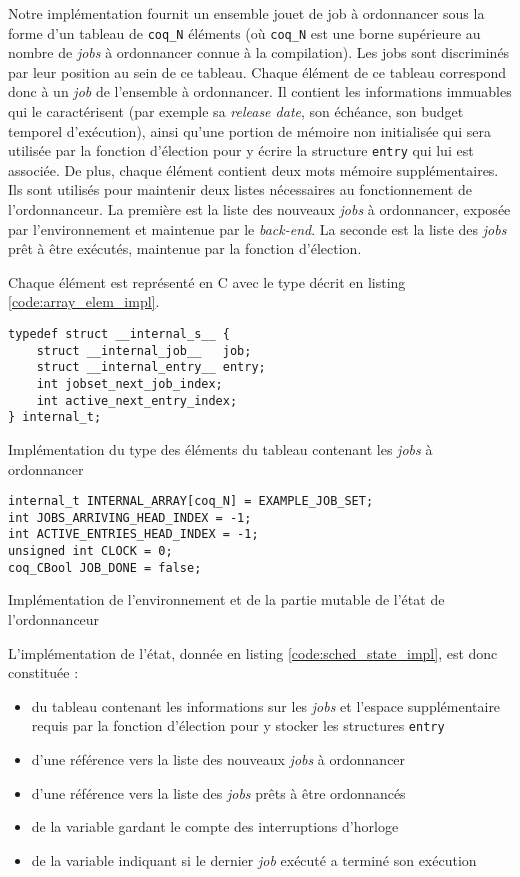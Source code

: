 	Notre implémentation fournit un ensemble jouet de job à ordonnancer sous la forme d'un tableau de \texttt{coq\_N} éléments (où \texttt{coq\_N} est une borne supérieure au nombre de \emph{jobs} à ordonnancer connue à la compilation). Les jobs sont discriminés par leur position au sein de ce tableau. Chaque élément de ce tableau correspond donc à un \emph{job} de l'ensemble à ordonnancer. Il contient les informations immuables qui le caractérisent (par exemple sa \emph{release date}, son échéance, son budget temporel d'exécution), ainsi qu'une portion de mémoire non initialisée qui sera utilisée par la fonction d'élection pour y écrire la structure \texttt{entry} qui lui est associée. De plus, chaque élément contient deux mots mémoire supplémentaires. Ils sont utilisés pour maintenir deux listes nécessaires au fonctionnement de l'ordonnanceur. La première est la liste des nouveaux \emph{jobs} à ordonnancer, exposée par l'environnement et maintenue par le \emph{back-end}. La seconde est la liste des \emph{jobs} prêt à être exécutés, maintenue par la fonction d'élection.

	Chaque élément est représenté en C avec le type décrit en listing \ref{code:array_elem_impl}.
	\begin{listing}[!ht]
	\begin{verbatim}
typedef struct __internal_s__ {
    struct __internal_job__   job;
    struct __internal_entry__ entry;
    int jobset_next_job_index;
    int active_next_entry_index;
} internal_t;
	\end{verbatim}
	\caption{Implémentation du type des éléments du tableau contenant les \emph{jobs} à ordonnancer}
	\label{code:array_elem_impl}
	\end{listing}

	\begin{listing}[!ht]
	\begin{verbatim}
internal_t INTERNAL_ARRAY[coq_N] = EXAMPLE_JOB_SET;
int JOBS_ARRIVING_HEAD_INDEX = -1;
int ACTIVE_ENTRIES_HEAD_INDEX = -1;
unsigned int CLOCK = 0;
coq_CBool JOB_DONE = false;
	\end{verbatim}
	\caption{Implémentation de l'environnement et de la partie mutable de l'état de l'ordonnanceur}
	\label{code:sched_state_impl}
	\end{listing}

	L'implémentation de l'état, donnée en listing \ref{code:sched_state_impl}, est donc constituée :
	\begin{itemize}
		\item du tableau contenant les informations sur les \emph{jobs} et l'espace supplémentaire requis par la fonction d'élection pour y stocker les structures \texttt{entry}
		\item d'une référence vers la liste des nouveaux \emph{jobs} à ordonnancer
		\item d'une référence vers la liste des \emph{jobs} prêts à être ordonnancés
		\item de la variable gardant le compte des interruptions d'horloge
		\item de la variable indiquant si le dernier \emph{job} exécuté a terminé son exécution
	\end{itemize}

